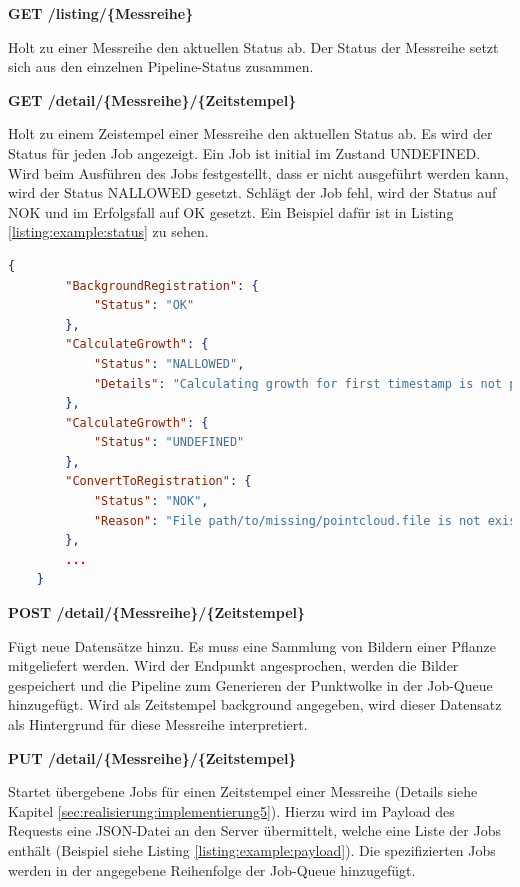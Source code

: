\documentclass[12pt,titlepage, twoside]{article}
\begin{document}
\textbf{GET /listing/\{Messreihe\}}

Holt zu einer Messreihe den aktuellen Status ab. Der Status der Messreihe setzt sich aus den einzelnen Pipeline-Status zusammen.

\newpage

\textbf{GET /detail/\{Messreihe\}/\{Zeitstempel\}}

Holt zu einem Zeistempel einer Messreihe den aktuellen Status ab. Es wird der Status für jeden Job angezeigt. Ein Job ist initial im Zustand \grqq{}UNDEFINED\grqq{}. 
Wird beim Ausführen des Jobs festgestellt, dass er nicht ausgeführt werden kann, wird der Status \grqq{}NALLOWED\grqq{} gesetzt. 
Schlägt der Job fehl, wird der Status auf \grqq{}NOK\grqq{} und im Erfolgsfall auf \grqq{}OK\grqq{} gesetzt.
Ein Beispiel dafür ist in Listing \ref{listing:example:status} zu sehen.

\begin{lstlisting}[language=json, caption={Beispiel Status eines Zeitstempels}, captionpos=b, label=listing:example:status]
    {
        "BackgroundRegistration": {
            "Status": "OK"
        },
        "CalculateGrowth": {
            "Status": "NALLOWED",
            "Details": "Calculating growth for first timestamp is not possible"
        },
        "CalculateGrowth": {
            "Status": "UNDEFINED"
        },
        "ConvertToRegistration": {
            "Status": "NOK",
            "Reason": "File path/to/missing/pointcloud.file is not existing"
        },
        ...
    }
    \end{lstlisting}

\textbf{POST /detail/\{Messreihe\}/\{Zeitstempel\}}

Fügt neue Datensätze hinzu. Es muss eine Sammlung von Bildern einer Pflanze mitgeliefert werden. 
Wird der Endpunkt angesprochen, werden die Bilder gespeichert und die Pipeline zum Generieren der Punktwolke in der Job-Queue hinzugefügt.
Wird als Zeitstempel \grqq{}background\grqq{} angegeben, wird dieser Datensatz als Hintergrund für diese Messreihe interpretiert.

\textbf{PUT /detail/\{Messreihe\}/\{Zeitstempel\}}

Startet übergebene Jobs für einen Zeitstempel einer Messreihe (Details siehe Kapitel \ref{sec:realisierung:implementierung5}). 
Hierzu wird im Payload des Requests eine JSON-Datei an den Server übermittelt, welche eine Liste der Jobs enthält (Beispiel siehe Listing \ref{listing:example:payload}).
Die spezifizierten Jobs werden in der angegebene Reihenfolge der Job-Queue hinzugefügt.
\\
\end{document}
